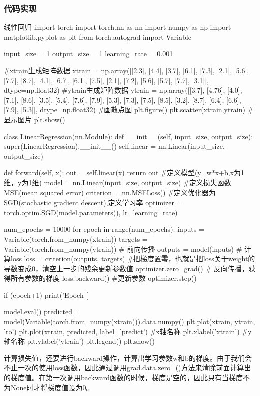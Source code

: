 \documentclass[openbib]{article}
\begin{document}
\subsubsection{代码实现}
	\begin{Python}{线性回归}
import torch
import torch.nn as nn
import numpy as np
import matplotlib.pyplot as plt
from torch.autograd import Variable

input_size = 1
output_size = 1
learning_rate = 0.001

#xtrain生成矩阵数据
xtrain = np.array([[2.3], [4.4], [3.7], [6.1], [7.3], [2.1], [5.6], [7.7], [8.7], [4.1], [6.7], [6.1], [7.5], [2.1],
[7.2], [5.6], [5.7], [7.7], [3.1]], dtype=np.float32)
#ytrain生成矩阵数据
ytrain = np.array([[3.7], [4.76], [4.0], [7.1], [8.6], [3.5], [5.4], [7.6], [7.9], [5.3], [7.3], [7.5], [8.5], [3.2],
[8.7], [6.4], [6.6], [7.9], [5.3]], dtype=np.float32)
#画散点图
plt.figure()
plt.scatter(xtrain,ytrain)
#显示图片
plt.show()

class  LinearRegression(nn.Module):
	def __init__(self, input_size, output_size):
		super(LinearRegression).__init__()
		self.linear = nn.Linear(input_size, output_size)

	def forward(self, x):
		out = self.linear(x)
		return out
#定义模型(y=w*x+b,x为1维，y为1维)
model = nn.Linear(input_size, output_size)
#定义损失函数MSE(mean squared error)
criterion = nn.MSELoss()
#定义优化器为SGD(stochastic gradient descent),定义学习率
optimizer = torch.optim.SGD(model.parameters(), lr=learning_rate)

num_epochs = 10000
for epoch in range(num_epochs):
	inputs = Variable(torch.from_numpy(xtrain))
	targets = Variable(torch.from_numpy(ytrain))
# 前向传播
	outputs = model(inputs)
# 计算loss
	loss = criterion(outputs, targets)
#把梯度置零，也就是把loss关于weight的导数变成0，清空上一步的残余更新参数值
	optimizer.zero_grad()
# 反向传播，获得所有参数的梯度
	loss.backward()
#更新参数
	optimizer.step()

if  (epoch+1) %
	print('Epoch [%

model.eval()
predicted = model(Variable(torch.from_numpy(xtrain))).data.numpy()
plt.plot(xtrain, ytrain, 'ro')
plt.plot(xtrain, predicted, label='predict')
#x轴名称
plt.xlabel('xtrain')
#y轴名称
plt.ylabel('ytrain')
plt.legend()
plt.show()

	\end{Python}
计算损失值，还要进行backward操作，计算出学习参数w和b的梯度。由于我们会不止一次的使用loss函数，因此通过调用grad.data.zero\_()方法来清除前面计算出的梯度值。在第一次调用backward函数的时候，梯度是空的，因此只有当梯度不为None时才将梯度值设为0。
\end{document}
